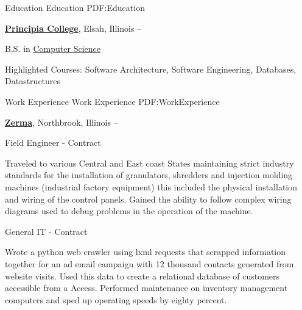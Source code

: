 \documentclass[a4paper,MMMyyyy,nonstopmode]{simpleresumecv}
\newcommand{\CVAuthor}{Bjørn Mathisen}
\newcommand{\CVWebpage}{https://bjornmathisen.com}
\begin{document}

\Title{\CVAuthor}

\begin{SubTitle}
\href{https://goo.gl/maps/gpk9cV4DUPH9WCLn6} %
{1511 Laurel, St Paul, Minnesota, 55104}
\par
\href{mailto:contact@bjornmathisen.com}
{contact@bjornmathisen.com}
\,\SubBulletSymbol\,
+1\,(224)\,622-8543
\,\SubBulletSymbol\,
\href{\CVWebpage}
{\url{Bjørn Mathisen}
\end{SubTitle}

\begin{Body}


\Section
{Education}
{Education}
{PDF:Education}

\Entry
\href{http://www.principiacollege.edu/}
{\textbf{Principia College}},
Elsah, Illinois
\hfill
{} --

\Gap
\BulletItem
B.S. in
\href{http://www.principiacollege.edu/computer-science}
{Computer Science}
\begin{Detail}
\SubBulletItem
Highlighted Courses: Software Architecture, Software Engineering, Databases, Datastructures\end{Detail}


\Section
{Work\newline
Experience}
{Work Experience}
{PDF:WorkExperience}

\Entry
\href{https://zerma.com/en}
{\textbf{Zerma}},
Northbrook, Illinois
\hfill {} --

\Gap
\BulletItem
Field Engineer - Contract

\begin{Detail}
\SubBulletItem
Traveled to various Central and East coast States maintaining strict industry standards for the installation of granulators, shredders and injection molding machines (industrial factory equipment) this included the physical installation and wiring of the control panels. 
\SubBulletItem
Gained the ability to follow complex wiring diagrams used to debug problems in the operation of the machine. 
\end{Detail}
\Gap
\BulletItem
General IT - Contract
\begin{Detail}
\SubBulletItem
Wrote a python web crawler using lxml requests that scrapped information together for an ad email campaign with 12 thousand contacts generated from website visits. Used this data to create a relational database of customers accessible from a Access.  Performed maintenance on inventory management computers and sped up operating speeds by eighty percent.
\Gap
\end{Detail}


\end{Body}
\end{document}
